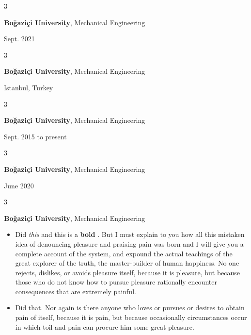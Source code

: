 \documentclass[10pt, letterpaper]{article}
\newenvironment{highlights}{
    \begin{itemize}[
        topsep=0.10 cm,
        parsep=0.10 cm,
        partopsep=0pt,
        itemsep=0pt,
        leftmargin=0.4 cm + 10pt
    ]
}{
    \end{itemize}
} %
\newenvironment{threecolentry}[3][]{
    \onecolentry
    \def\thirdColumn{#3}
    \setcolumnwidth{1 cm, \fill, 4.5 cm}
    \begin{paracol}{3}
    {\raggedright #2} \switchcolumn
}{
    \switchcolumn \raggedleft \thirdColumn
    \end{paracol}
    \endonecolentry
} %
\let\hrefWithoutArrow\href
\renewcommand{\href}[2]{\hrefWithoutArrow{#1}{\mbox{\ifthenelse{\equal{#2}{}}{ }{#2 }\raisebox{.15ex}{\footnotesize \faExternalLink*}}}}
\begin{document}
        \begin{threecolentry}{\textbf{}}{
            Sept. 2021
        }
            \textbf{Boğaziçi University}, Mechanical Engineering
        \end{threecolentry}

        \vspace{0.2 cm}

        \begin{threecolentry}{\textbf{}}{
            Istanbul, Turkey
        }
            \textbf{Boğaziçi University}, Mechanical Engineering
        \end{threecolentry}

        \vspace{0.2 cm}

        \begin{threecolentry}{\textbf{}}{
            Sept. 2015 to present
        }
            \textbf{Boğaziçi University}, Mechanical Engineering
        \end{threecolentry}

        \vspace{0.2 cm}

        \begin{threecolentry}{\textbf{}}{
            June 2020
        }
            \textbf{Boğaziçi University}, Mechanical Engineering
        \end{threecolentry}

        \vspace{0.2 cm}

        \begin{threecolentry}{\textbf{}}{
            
        }
            \textbf{Boğaziçi University}, Mechanical Engineering
            \begin{highlights}
                \item Did \textit{this} and this is a \textbf{bold} \href{https://example.com}{link}. But I must explain to you how all this mistaken idea of denouncing pleasure and praising pain was born and I will give you a complete account of the system, and expound the actual teachings of the great explorer of the truth, the master-builder of human happiness. No one rejects, dislikes, or avoids pleasure itself, because it is pleasure, but because those who do not know how to pursue pleasure rationally encounter consequences that are extremely painful.
                \item Did that. Nor again is there anyone who loves or pursues or desires to obtain pain of itself, because it is pain, but because occasionally circumstances occur in which toil and pain can procure him some great pleasure.
            \end{highlights}
        \end{threecolentry}
\end{document}
